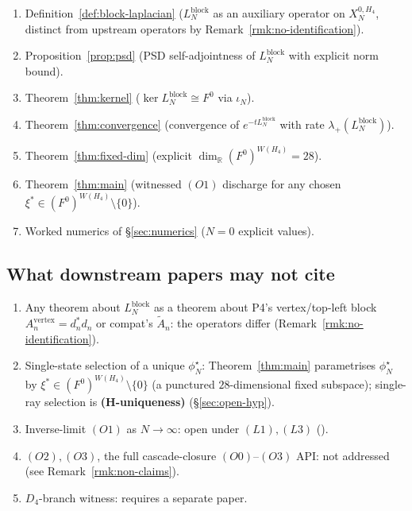 \documentclass[11pt]{article}
\newcommand{\R}{\mathbb{R}}
\theoremstyle{definition}
\begin{document}
\begin{enumerate}[leftmargin=2em]
\item Definition~\ref{def:block-laplacian} ($L_N^{\mathrm{block}}$
  as an auxiliary operator on $X_N^{0, H_4}$, distinct from
  upstream operators by Remark~\ref{rmk:no-identification}).
\item Proposition~\ref{prop:psd} (PSD self-adjointness of
  $L_N^{\mathrm{block}}$ with explicit norm bound).
\item Theorem~\ref{thm:kernel} ($\ker L_N^{\mathrm{block}} \cong
  F^0$ via $\iota_N$).
\item Theorem~\ref{thm:convergence} (convergence of
  $e^{-t L_N^{\mathrm{block}}}$ with rate
  $\lambda_{+}(L_N^{\mathrm{block}})$).
\item Theorem~\ref{thm:fixed-dim} (explicit
  $\dim_{\R} (F^0)^{W(H_4)} = 28$).
\item Theorem~\ref{thm:main} (witnessed $(O1)$ discharge for
  any chosen $\xi^{*} \in (F^0)^{W(H_4)} \setminus \{0\}$).
\item Worked numerics of \S\ref{sec:numerics} ($N = 0$ explicit
  values).
\end{enumerate}

\subsection{What downstream papers may not cite}

\begin{enumerate}[leftmargin=2em]
\item Any theorem about $L_N^{\mathrm{block}}$ as a theorem about
  P4's vertex/top-left block
  $A_n^{\mathrm{vertex}} = d_n^{*} d_n$ or compat's
  $\widetilde A_n$: the operators differ
  (Remark~\ref{rmk:no-identification}).
\item Single-state selection of a unique
  $\phi^{\star}_{N}$: Theorem~\ref{thm:main} parametrises
  $\phi^{\star}_{N}$ by $\xi^{*} \in (F^0)^{W(H_4)} \setminus
  \{0\}$ (a punctured $28$-dimensional fixed subspace); single-ray selection is
  \textbf{(H-uniqueness)} (\S\ref{sec:open-hyp}).
\item Inverse-limit $(O1)$ as $N \to \infty$: open under
  $(L1), (L3)$
  (\cite[\S\texttt{sec:scope-and-gap}]{RefinementCompat}).
\item $(O2), (O3)$, the full cascade-closure $(O0)$--$(O3)$ API:
  not addressed (see Remark~\ref{rmk:non-claims}).
\item $D_4$-branch witness: requires a separate paper.
\end{enumerate}
\end{document}
